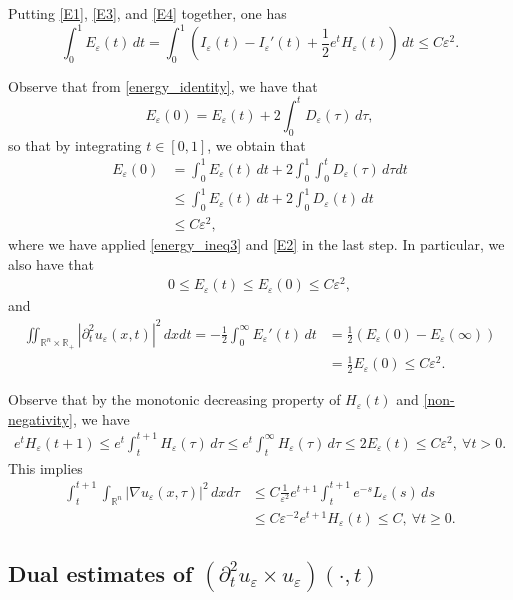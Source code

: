 \documentclass[12pt,twoside,reqno]{amsart}
\theoremstyle{definition}              %
\theoremstyle{remark}                  %
\newcommand{\R}{\mathbb{R}}                 %
\newcommand{\eps}{\varepsilon}
\renewcommand{\1}{\mathbbm{1}}                                      %
\numberwithin{equation}{section}
\numberwithin{definition}{section}
\numberwithin{theorem}{section}
\numberwithin{remark}{section}
\begin{document}
Putting \eqref{E1}, 
\eqref{E3}, and \eqref{E4} together, one has
\begin{equation}\label{energy_ineq3}
\int_0^1 E_\eps(t)\,dt
=\int_0^1 (I_\eps(t)-I_\eps'(t)+\frac12 e^t H_\eps(t))\,dt\le C\eps^2.
\end{equation}

Observe that from \eqref{energy_identity}, we have
that
\begin{equation}
E_\eps(0)=E_\eps(t)+2\int_0^t D_\eps(\tau)\,d\tau,     
\end{equation}
so that by integrating $t\in [0,1]$, we obtain that
\begin{align*}
E_\eps(0)&=\int_0^1 E_\eps(t)\,dt+2\int_0^1\int_0^t D_\eps(\tau)\,d\tau dt\\
&\le \int_0^1 E_\eps(t)\,dt+2\int_0^1D_\eps(t)\,dt\\
&\le C\eps^2,
\end{align*}
where we have applied \eqref{energy_ineq3} and \eqref{E2} in the last step. In particular, we also have  that
\begin{align}\label{energy_ineq4}
0\le E_\eps(t)\le E_\eps(0)\le C\eps^2, 
\end{align}
and
\begin{align}\label{energy_ineq5}
\iint_{\mathbb{R}^n\times\R_+} |\partial_t^2u_\eps(x,t)|^2\,dxdt
=-\frac12\int_0^\infty E_\eps'(t)\,dt
&=\frac12(E_\eps(0)-E_\eps(\infty))\nonumber\\
&=\frac12 E_\eps(0)\le C\eps^2.
\end{align}

Observe that by the monotonic decreasing property of $H_\eps(t)$ and
\eqref{non-negativity}, we have
\begin{align*}
 e^t H_\eps(t+1)\le e^t\int_t^{t+1}H_\eps(\tau)\,d\tau 
 \le e^t\int_t^\infty H_\eps(\tau)\,d\tau
 \le 2E_\eps(t)\le C\eps^2,\ \forall t>0.
\end{align*}
This implies
\begin{align}\label{energy_ineq6}
\int_t^{t+1}\int_{\mathbb{R}^n}
|\nabla u_\eps(x,\tau)|^2\,dxd\tau
&\le
C\frac{1}{\eps^2}
e^{t+1}\int_t^{t+1}e^{-s}L_\eps(s)\,ds\nonumber\\
&\le C\eps^{-2}e^{t+1}H_\eps(t) \le C, 
\ \forall t\ge 0.
\end{align}

\medskip
\subsection{Dual estimates of $(\partial_t^2u_\eps\times u_\eps)(\cdot,t)$}
\end{document}
